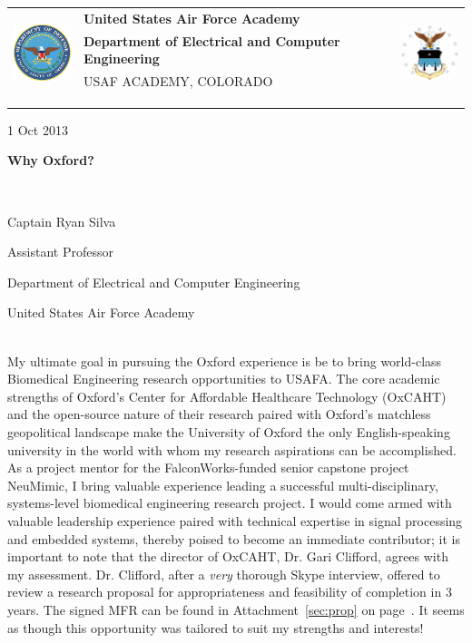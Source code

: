 \documentclass{article}
\begin{document}
	\noindent \begin{tabu} to \textwidth{l X[c] r}
	 & 
	\textbf{United States Air Force Academy} &  
	\\
	& \textbf{Department of Electrical and Computer Engineering} & \\
	& \tiny{USAF ACADEMY, COLORADO}\\
	\\ \\ \\
	\end{tabu}

	\hfill 1 Oct 2013
	\centerline{\LARGE{\textbf{Why Oxford?}}} \hspace{0pt} \\
	\centerline{\Large{Captain Ryan Silva}}
	\centerline{\large{Assistant Professor}}
	\centerline{\large{Department of Electrical and Computer Engineering}}
	\centerline{\large{United States Air Force Academy}} \hspace{0pt} \\
\indent My ultimate goal in pursuing the Oxford experience is be to bring world-class
Biomedical Engineering research opportunities to USAFA. The core academic
strengths of Oxford's Center for Affordable Healthcare Technology (OxCAHT) and
the open-source nature of their research paired with Oxford's matchless
geopolitical landscape make the University of Oxford the only English-speaking
university in the world with whom my research aspirations can be accomplished.
As a project mentor for the FalconWorks-funded senior capstone project
NeuMimic, I bring valuable experience leading a successful multi-disciplinary,
systems-level biomedical engineering research project. I would come armed with 
valuable leadership experience paired with technical expertise in signal 
processing and embedded systems, thereby poised to become an immediate contributor;
it is important to note that the director of OxCAHT, Dr. Gari Clifford, agrees
with my assessment. Dr. Clifford, after a \emph{very} thorough Skype interview,
offered to review a research proposal for appropriateness and feasibility of
completion in 3 years. The signed MFR can be found in Attachment~\ref{sec:prop}
on page~\pageref{sec:prop}. It seems as though this opportunity was tailored to 
suit my strengths and interests! 
 
\end{document}
